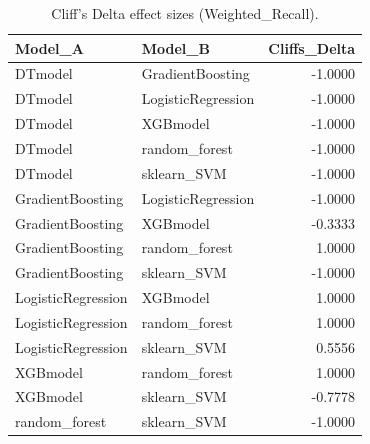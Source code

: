 \begin{table}[t]
\centering
\begin{tabular}{llr}
\toprule
Model_A & Model_B & Cliffs_Delta \\
\midrule
DTmodel & GradientBoosting & -1.0000 \\
DTmodel & LogisticRegression & -1.0000 \\
DTmodel & XGBmodel & -1.0000 \\
DTmodel & random_forest & -1.0000 \\
DTmodel & sklearn_SVM & -1.0000 \\
GradientBoosting & LogisticRegression & -1.0000 \\
GradientBoosting & XGBmodel & -0.3333 \\
GradientBoosting & random_forest & 1.0000 \\
GradientBoosting & sklearn_SVM & -1.0000 \\
LogisticRegression & XGBmodel & 1.0000 \\
LogisticRegression & random_forest & 1.0000 \\
LogisticRegression & sklearn_SVM & 0.5556 \\
XGBmodel & random_forest & 1.0000 \\
XGBmodel & sklearn_SVM & -0.7778 \\
random_forest & sklearn_SVM & -1.0000 \\
\bottomrule
\end{tabular}
\caption{Cliff's Delta effect sizes (Weighted_Recall).}
\label{tab:cliffs_Weighted_Recall}
\end{table}